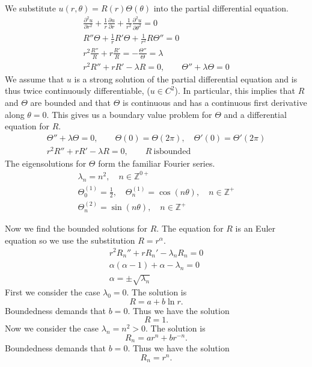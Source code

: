 {%
\begin{Solution}
  \label{solution laplace unit disk}
  We substitute $u(r,\theta) = R(r) \Theta(\theta)$ into the partial differential equation.
  \begin{gather*}
    \frac{\partial^2 u}{\partial r^2} + \frac{1}{r} \frac{\partial u}{\partial r} 
    + \frac{1}{r^2} \frac{\partial^2 u}{\partial \theta^2} = 0
    \\
    R'' \Theta + \frac{1}{r} R' \Theta + \frac{1}{r^2} R \Theta'' = 0
    \\
    r^2 \frac{R''}{R} + r \frac{R'}{R} = - \frac{\Theta''}{\Theta} = \lambda
    \\
    r^2 R'' + r R' - \lambda R =0, \qquad \Theta'' + \lambda \Theta = 0
  \end{gather*}
  We assume that $u$ is a strong solution of the partial differential equation
  and is thus twice continuously differentiable, ($u \in C^2$).
  In particular, this implies that $R$ and $\Theta$ are bounded and that
  $\Theta$ is continuous and has a continuous first derivative along $\theta = 0$.
  This gives us a boundary value problem for $\Theta$ and a differential equation
  for $R$.
  \begin{gather*}
    \Theta'' + \lambda \Theta = 0, \qquad \Theta(0) = \Theta(2\pi), \quad \Theta'(0) = \Theta'(2\pi)
    \\
    r^2 R'' + r R' - \lambda R = 0, \qquad R\ \mathrm{is bounded}
  \end{gather*}
  The eigensolutions for $\Theta$ form the familiar Fourier series.
  \begin{gather*}
    \lambda_n = n^2, \quad n \in \mathbb{Z}^{0+}
    \\
    \Theta_0^{(1)} = \frac{1}{2}, \quad  \Theta_n^{(1)} = \cos(n\theta), \quad n \in \mathbb{Z}^+
    \\
    \Theta_n^{(2)} = \sin(n \theta), \quad n \in \mathbb{Z}^+
  \end{gather*}

  Now we find the bounded solutions for $R$.
  The equation for $R$ is an Euler equation
  so we use the substitution $R = r^\alpha$.
  \begin{gather*}
    r^2 R_n'' + r R_n' - \lambda_n R_n = 0
    \\
    \alpha(\alpha -1) + \alpha - \lambda_n = 0
    \\
    \alpha = \pm \sqrt{\lambda_n}
  \end{gather*}
  First we consider the case $\lambda_0 = 0$.  The solution is
  \[
  R = a + b \ln r.
  \]
  Boundedness demands that $b = 0$.  Thus we have the solution
  \[
  R = 1.
  \]
  Now we consider the case $\lambda_n = n^2 > 0$.  The solution is
  \[
  R_n = a r^n + b r^{-n}.
  \]
  Boundedness demands that $b = 0$.  Thus we have the solution
  \[
  R_n = r^n.
  \]


\end{Solution}}
